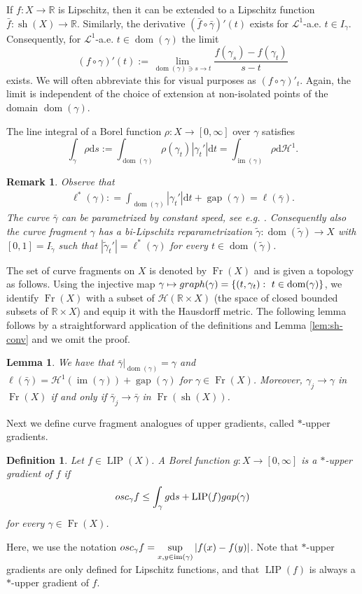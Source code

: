 \documentclass{amsart}
\newtheorem{definition}[theorem]{Definition}
\newtheorem{lemma}[theorem]{Lemma}
\newtheorem{remark}[theorem]{Remark}
\numberwithin{equation}{section}
\newcommand{\R}{\mathbb{R}}
\newcommand{\Ha}{\mathcal{H}}
\newcommand{\leb}{\mathcal{L}}
\newcommand{\LIP}{\operatorname{LIP}}
\newcommand{\im}{\operatorname{im}}
\newcommand{\gap}{\operatorname{gap}}
\newcommand{\dom}{\operatorname{dom}}
\newcommand{\Fr}{\operatorname{Fr}}
\newcommand{\sh}{\operatorname{sh}}
\newcommand{\ud}{\mathrm {d}}
\newcommand{\defl}{\mathrel{\mathop:}=}
\begin{document}
If $f:X\to \R$ is Lipschitz, then it can be extended to a Lipschitz function $\bar f:\sh(X)\to \R$. Similarly, the derivative $(\bar f\circ \bar \gamma)'(t)$ exists for $\leb^1$-a.e. $t\in I_\gamma$. Consequently, for $\leb^1$-a.e. $t\in \dom(\gamma)$ the limit
\[
(f \circ \gamma)'(t):= \lim_{\dom(\gamma)\ni s\to t}\frac{f(\gamma_s)-f(\gamma_t)}{s-t}
\]
exists. We will often abbreviate this for visual purposes as $(f \circ \gamma)'_t$. Again, the limit is independent of the choice of extension at non-isolated points of the domain $\dom(\gamma)$. 

The line integral of a Borel function $\rho:X\to [0,\infty]$ over $\gamma$ satisfies
\[
\int_\gamma\rho\ud s:=\int_{\dom(\gamma)}\rho(\gamma_t)|\gamma_t'|\ud t=\int_{\im(\gamma)}\rho\ud\Ha^1.
\]

\begin{remark}\label{rmk:reparam}
 Observe that
\begin{align*}
\ell^\ast(\gamma)\defl \int_{\dom(\gamma)}|\gamma_t'| \ud t+\gap(\gamma)=\ell(\bar\gamma).
\end{align*}
The curve $\bar\gamma$ can be parametrized by constant speed, see e.g. \cite[Theorem 4.2.1]{ambrosiotilli}.
Consequently also the curve fragment $\gamma$ has a bi-Lipschitz reparametrization $\tilde\gamma:\dom(\tilde\gamma)\to X$ with $[0,1]=I_{\tilde\gamma}$ such that $|\tilde\gamma_t'|=\ell^*(\gamma)$ for every $t\in \dom(\tilde\gamma)$. 
\end{remark}


The set of curve fragments on $X$ is denoted by $\Fr(X)$ and is given a topology as follows. Using the injective map $\gamma\mapsto {\rm graph}(\gamma)=\{(t,\gamma_t):\ t\in \dom(\gamma)\}$,
we identify $\Fr(X)$ with a subset of $\mathcal H(\R\times X)$ (the space of closed bounded subsets of $\R\times X$) and equip it with the Hausdorff metric. The following lemma follows by a straightforward application of the definitions and Lemma \ref{lem:sh-conv} and we omit the proof.
\begin{lemma}\label{lem:sh-ext-curve}
We have that $\bar\gamma|_{\dom(\gamma)}=\gamma$ and $\ell(\bar\gamma)=\Ha^1(\im(\gamma))+\gap(\gamma)$ for $\gamma\in\Fr(X)$. Moreover, $\gamma_j\to\gamma$ in $\Fr(X)$ if and only if $\bar\gamma_j\to\bar\gamma$ in $\Fr(\sh(X))$.
\end{lemma}

Next we define curve fragment analogues of upper gradients, called $\ast$-upper gradients.

\begin{definition}\label{def:star_ug}
Let $f\in \LIP(X)$. A Borel function $g:X\to[0,\infty]$ is a $\ast$-upper gradient of $f$ if
\begin{equation}\label{eq:star_ug_ineq-defn}
{\rm osc}_\gamma f\le \int_\gamma g\ud s+\LIP(f){\rm gap}(\gamma)
\end{equation}
for every $\gamma\in \Fr(X)$. 
\end{definition}
Here, we use the notation $\displaystyle {\rm osc}_\gamma f=\sup_{x,y\in \im(\gamma)}|f(x)-f(y)|$. Note that $\ast$-upper gradients are only defined for Lipschitz functions, and that $\LIP(f)$ is always a $\ast$-upper gradient of $f$.
\end{document}
